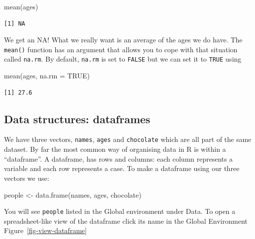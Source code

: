 \documentclass[
  letterpaper,
  DIV=11,
  numbers=noendperiod]{scrreprt}
\newenvironment{Shaded}{\begin{snugshade}}{\end{snugshade}}
\newcommand{\AttributeTok}[1]{\textcolor[rgb]{0.40,0.45,0.13}{#1}}
\newcommand{\ConstantTok}[1]{\textcolor[rgb]{0.56,0.35,0.01}{#1}}
\newcommand{\FunctionTok}[1]{\textcolor[rgb]{0.28,0.35,0.67}{#1}}
\newcommand{\NormalTok}[1]{\textcolor[rgb]{0.00,0.23,0.31}{#1}}
\newcommand{\OtherTok}[1]{\textcolor[rgb]{0.00,0.23,0.31}{#1}}
\begin{document}
\begin{Shaded}
\begin{Highlighting}[]
\FunctionTok{mean}\NormalTok{(ages)}
\end{Highlighting}
\end{Shaded}

\begin{verbatim}
[1] NA
\end{verbatim}

We get an NA! What we really want is an average of the ages we do have.
The \texttt{mean()} function has an argument that allows you to cope
with that situation called \texttt{na.rm}. By default, \texttt{na.rm} is
set to \texttt{FALSE} but we can set it to \texttt{TRUE} using

\begin{Shaded}
\begin{Highlighting}[]
\FunctionTok{mean}\NormalTok{(ages, }\AttributeTok{na.rm =} \ConstantTok{TRUE}\NormalTok{)}
\end{Highlighting}
\end{Shaded}

\begin{verbatim}
[1] 27.6
\end{verbatim}

\hypertarget{data-structures-dataframes}{%
\subsection{Data structures:
dataframes}\label{data-structures-dataframes}}

We have three vectors, \texttt{names}, \texttt{ages} and
\texttt{chocolate} which are all part of the same dataset. By far the
most common way of organising data in R is within a ``dataframe''. A
dataframe, has rows and columns: each column represents a variable and
each row represents a case. To make a dataframe using our three vectors
we use:

\begin{Shaded}
\begin{Highlighting}[]
\NormalTok{people }\OtherTok{\textless{}{-}} \FunctionTok{data.frame}\NormalTok{(names, ages, chocolate)}
\end{Highlighting}
\end{Shaded}

You will see \texttt{people} listed in the Global environment under
Data. To open a spreadsheet-like view of the dataframe click its name in
the Global Environment Figure~\ref{fig-view-dataframe}
\end{document}
